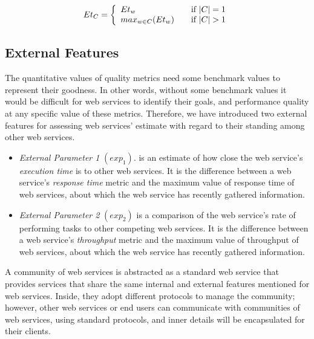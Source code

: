 \documentclass[10pt,journal,cspaper,compsoc]{IEEEtran}
\begin{document}
\begin{itemize}
	\begin{equation}
		Et_{C} = \left\{ 
			\begin{array}{l l}
				Et_{w} & \quad \text{if $|C| = 1$}\\
				max_{w \in C}{(Et_{w})} & \quad \text{if $|C| > 1$}
			\end{array} \right.
	\end{equation}
	
	
\end{itemize}


\subsection{External Features}\label{s:ef}

The quantitative values of quality metrics need some benchmark values to represent their goodness. In other words, without some benchmark values it would be difficult for web services to identify their goals, and performance quality at any specific value of these metrics. Therefore, we have introduced two external features for assessing web services' estimate with regard to their standing among other web services.

\begin{itemize}
  \item \emph{External Parameter 1} $(exp_1)$. is an estimate of how close the web service's \emph{execution time} is to other web services. It is the difference between a web service's \emph{response time} metric and the maximum value of response time of web services, about which the web service has recently gathered information.
	\item \emph{External Parameter 2} $(exp_2)$ is a comparison of the web service's rate of performing tasks to other competing web services. It is the difference between a web service's \emph{throughput} metric and the maximum value of throughput of web services, about which the web service has recently gathered information.
\end{itemize}

A community of web services is abstracted as a standard web service that provides services that share the same internal and external features mentioned for web services. Inside, they adopt different protocols to manage the community; however, other web services or end users can communicate with communities of web services, using standard protocols, and inner details will be encapsulated for their clients.
\end{document}
